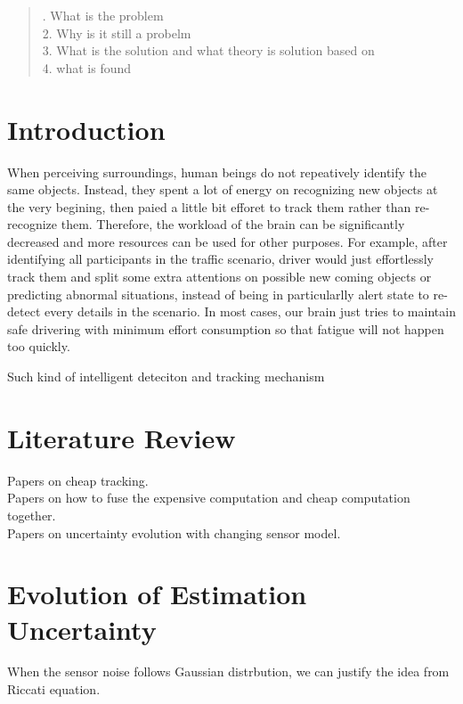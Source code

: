 \documentclass[12pt]{article}
\begin{document}
\maketitle

\begin{abstract}
. What is the problem\\
2. Why is it still a probelm\\
3. What is the solution and what theory is solution based on\\
4. what is found\\
\end{abstract}

\section{Introduction}\label{introduction}
\indent When perceiving surroundings, human beings do not repeatively identify the same objects. Instead, they spent a lot of energy on recognizing new objects at the very begining, then paied a little bit efforet to track them rather than re-recognize them. Therefore, the workload of the brain can be significantly decreased and more resources can be used for other purposes. For example, after identifying all participants in the traffic scenario, driver would just  effortlessly track them and split some extra attentions on possible new coming objects or predicting abnormal situations, instead of being in particularlly alert state to re-detect every details in the scenario. In most cases, our brain just tries to maintain safe drivering with minimum effort consumption so that fatigue will not happen too quickly.

Such kind of intelligent deteciton and tracking mechanism 

\section{Literature Review}\label{literature_review}
\noindent Papers on cheap tracking.\\
Papers on how to fuse the expensive computation and cheap computation together.\\
Papers on uncertainty evolution with changing sensor model.

\section{Evolution of Estimation Uncertainty}\label{estmation_uncertainty}
When the sensor noise follows Gaussian distrbution, we can justify the idea from Riccati equation.
\end{document}
